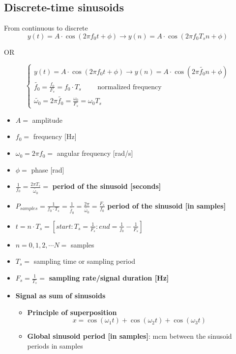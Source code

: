 \subsection{Discrete-time sinusoids}
From continuous to discrete
    $$
    y(t)=A\cdot\cos(2\pi f_0t+\phi)\rightarrow y(n)=A\cdot\cos(2\pi f_0T_sn+\phi)
    $$
    \begin{center}
        OR
    \end{center}
    $$
    \begin{cases}
        y(t)=A\cdot\cos(2\pi f_0t+\phi)\rightarrow y(n)=A\cdot\cos(2\pi \tilde{f_0}n+\phi)\\
        \tilde{f_0}=\frac{f_0}{F_s}=f_0\cdot T_s\qquad\text{ normalized frequency}\\
        \tilde{\omega_0}=2\pi\tilde{f_0}=\frac{\omega_0}{F_s}=\omega_0T_s
    \end{cases}
    $$
\begin{itemize}
    \item $A=$ amplitude
    \item $f_0=$ frequency [Hz]
    \item $\omega_0=2\pi f_0=$ angular frequency [rad/s]
    \item $\phi=$ phase [rad]
    \item $\frac{1}{f_0}=\frac{2\pi T_s}{\tilde{\omega_0}}=$ \textbf{period of the sinusoid [seconds]}
    \item $P_{samples}=\frac{1}{f_0\cdot T_s}=\frac{1}{\tilde{f_0}}=\frac{2\pi}{\tilde{\omega_0}}=\frac{F_s}{f_0}$ \textbf{period of the sinusoid [in samples]}
    \item $t=n\cdot T_s=\left[start:T_s=\frac{1}{F_s}:end=\frac{1}{f_0}-\frac{1}{F_s}\right]$
    \item $n=0,1,2,\cdots N=$ samples
    \item $T_s=$ sampling time or sampling period
    \item $F_s=\frac{1}{T_s}=$ \textbf{sampling rate/signal duration [Hz]}
    \item \textbf{Signal as sum of sinusoids}
    \begin{itemize}
        \item \textbf{Principle of superposition}
        $$x=\cos(\omega_1t)+\cos(\omega_2t)+\cos(\omega_3t)$$
        \item \textbf{Global sinusoid period [in samples]}: mcm between the sinusoid periods in samples
    \end{itemize}
\end{itemize}